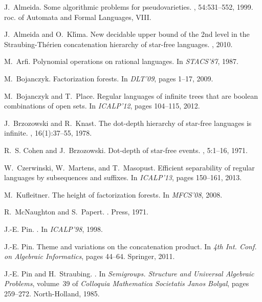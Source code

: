 \documentclass[envcountsame]{llncs}
\begin{document}

\begin{thebibliography}{10}

J.~Almeida.
\newblock Some algorithmic problems for pseudovarieties.
, 54:531--552, 1999.
roc. of {Automata and Formal Languages, VIII}.

J.~Almeida and O.~Kl\'{\i}ma.
\newblock New decidable upper bound of the 2nd level in the
  {S}traubing-{T}h{\'e}rien concatenation hierarchy of star-free languages.
, 2010.

M.~Arfi.
\newblock Polynomial operations on rational languages.
\newblock In {\em STACS'87}, 1987.

M.~Bojanczyk.
\newblock Factorization forests.
\newblock In {\em DLT'09}, pages 1--17, 2009.

M.~Bojanczyk and T.~Place.
\newblock Regular languages of infinite trees that are boolean combinations of
  open sets.
\newblock In {\em ICALP'12}, pages 104--115, 2012.

J.~Brzozowski and R.~Knast.
\newblock The dot-depth hierarchy of star-free languages is infinite.
, 16(1):37--55, 1978.

R.~S. Cohen and J.~Brzozowski.
\newblock Dot-depth of star-free events.
, 5:1--16, 1971.

W.~Czerwinski, W.~Martens, and T.~Masopust.
\newblock Efficient separability of regular languages by subsequences and
  suffixes.
\newblock In {\em ICALP'13}, pages 150--161, 2013.

M.~Kufleitner.
\newblock The height of factorization forests.
\newblock In {\em MFCS'08}, 2008.

R.~McNaughton and S.~Papert.
.
 Press, 1971.

J.-E. Pin.
.
\newblock In {\em {ICALP'98}}, 1998.

J.-E. Pin.
\newblock Theme and variations on the concatenation product.
\newblock In {\em 4th Int. Conf. on Algebraic Informatics}, pages 44--64.
  Springer, 2011.

J.-E. Pin and H.~Straubing.
.
\newblock In {\em {Semigroups. Structure and Universal Algebraic Problems}},
  volume~39 of {\em Colloquia Mathematica Societatis Janos Bolyal}, pages
  259--272. North-Holland, 1985.


\end{thebibliography}
\end{document}

